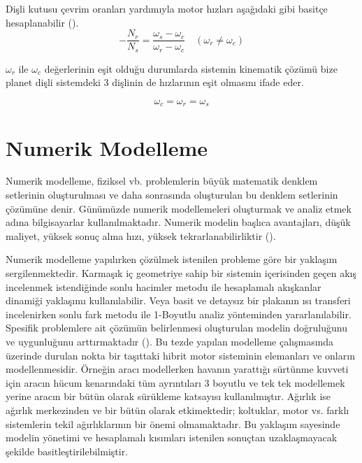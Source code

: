Dişli kutusu çevrim oranları yardımıyla motor hızları aşağıdaki gibi
basitçe hesaplanabilir (\cite{planetgeartrainreferans}).
\begin{equation}
    -\frac{N_r}{N_s}=\frac{\omega_s-\omega_c}{\omega_r-\omega_c} \quad(\omega_r\neq\omega_c)
\end{equation}

$\omega_r$ ile $\omega_c$ değerlerinin eşit olduğu durumlarda sistemin kinematik çözümü bize planet dişli sistemdeki 3 dişlinin
de hızlarının eşit olmasını ifade eder.

\begin{equation}
    \omega_c=\omega_r=\omega_s
\end{equation}

\section{Numerik Modelleme}

Numerik modelleme, fiziksel vb. problemlerin büyük matematik denklem setlerinin oluşturulması ve daha sonrasında
oluşturulan bu denklem setlerinin çözümüne denir. Günümüzde numerik modellemeleri oluşturmak ve analiz etmek adına bilgisayarlar 
kullanılmaktadır. Numerik modelin başlıca avantajları, düşük maliyet, yüksek sonuç alma hızı,
yüksek tekrarlanabilirliktir (\cite{numerikmodellemereferansbir}). 

Numerik modelleme yapılırken çözülmek istenilen probleme göre bir yaklaşım sergilenmektedir. Karmaşık iç geometriye
sahip bir sistemin içerisinden geçen akış incelenmek istendiğinde sonlu hacimler metodu ile hesaplamalı akışkanlar dinamiği
yaklaşımı kullanılabilir. Veya basit ve detaysız bir plakanın ısı transferi incelenirken sonlu fark metodu ile 1-Boyutlu analiz yönteminden yararlanılabilir.
Spesifik problemlere ait çözümün belirlenmesi oluşturulan modelin doğruluğunu ve uygunluğunu arttırmaktadır (\cite{numericmodelfidelity}). Bu tezde yapılan modelleme 
çalışmasında üzerinde durulan nokta bir taşıttaki hibrit motor sisteminin elemanları ve onların modellenmesidir. Örneğin aracı modellerken 
havanın yarattığı sürtünme kuvveti için aracın hücum kenarındaki tüm ayrıntıları 3 boyutlu ve tek tek modellemek yerine aracın bir bütün olarak 
sürükleme katsayısı kullanılmıştır. Ağırlık ise ağırlık merkezinden ve bir bütün olarak etkimektedir; koltuklar, motor vs. farklı sistemlerin tekil ağırlıklarının bir önemi olmamaktadır.
Bu yaklaşım sayesinde modelin yönetimi ve hesaplamalı kısımları istenilen sonuçtan uzaklaşmayacak şekilde basitleştirilebilmiştir.   

